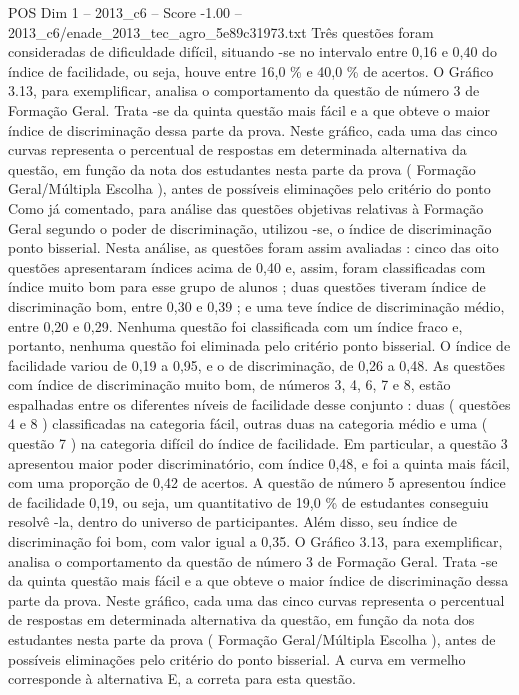 \begin{textsample}{POS Dim 1 – 2013\_c6 – Score -1.00 – 2013\_c6/enade\_2013\_tec\_agro\_5e89c31973.txt}
Três questões foram consideradas de dificuldade difícil, situando -se no intervalo entre 0,16 e 0,40 do índice de facilidade, ou seja, houve entre 16,0 \% e 40,0 \% de acertos.
O Gráfico 3.13, para exemplificar, analisa o comportamento da questão de número 3 de Formação Geral.
Trata -se da quinta questão mais fácil e a que obteve o maior índice de discriminação dessa parte da prova.
Neste gráfico, cada uma das cinco curvas representa o percentual de respostas em determinada alternativa da questão, em função da nota dos estudantes nesta parte da prova ( Formação Geral/Múltipla Escolha ), antes de possíveis eliminações pelo critério do ponto Como já comentado, para análise das questões objetivas relativas à Formação Geral segundo o poder de discriminação, utilizou -se, o índice de discriminação ponto bisserial.
Nesta análise, as questões foram assim avaliadas : cinco das oito questões apresentaram índices acima de 0,40 e, assim, foram classificadas com índice muito bom para esse grupo de alunos ; duas questões tiveram índice de discriminação bom, entre 0,30 e 0,39 ; e uma teve índice de discriminação médio, entre 0,20 e 0,29.
Nenhuma questão foi classificada com um índice fraco e, portanto, nenhuma questão foi eliminada pelo critério ponto bisserial.
O índice de facilidade variou de 0,19 a 0,95, e o de discriminação, de 0,26 a 0,48.
As questões com índice de discriminação muito bom, de números 3, 4, 6, 7 e 8, estão espalhadas entre os diferentes níveis de facilidade desse conjunto : duas ( questões 4 e 8 ) classificadas na categoria fácil, outras duas na categoria médio e uma ( questão 7 ) na categoria difícil do índice de facilidade.
Em particular, a questão 3 apresentou maior poder discriminatório, com índice 0,48, e foi a quinta mais fácil, com uma proporção de 0,42 de acertos.
A questão de número 5 apresentou índice de facilidade 0,19, ou seja, um quantitativo de 19,0 \% de estudantes conseguiu resolvê -la, dentro do universo de participantes.
Além disso, seu índice de discriminação foi bom, com valor igual a 0,35.
O Gráfico 3.13, para exemplificar, analisa o comportamento da questão de número 3 de Formação Geral.
Trata -se da quinta questão mais fácil e a que obteve o maior índice de discriminação dessa parte da prova.
Neste gráfico, cada uma das cinco curvas representa o percentual de respostas em determinada alternativa da questão, em função da nota dos estudantes nesta parte da prova ( Formação Geral/Múltipla Escolha ), antes de possíveis eliminações pelo critério do ponto bisserial.
A curva em vermelho corresponde à alternativa E, a correta para esta questão.

\end{textsample}
